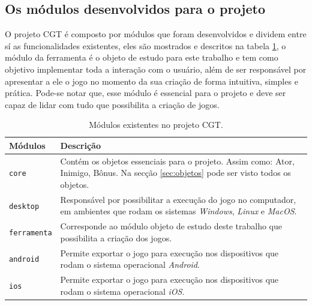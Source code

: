 \documentclass[12pt,twoside,openright,a4paper,english,brazil,sumario=tradicional]{abntex2}
\begin{document}
\subsection{Os módulos desenvolvidos para o projeto}
O projeto CGT é composto por módulos que foram desenvolvidos e dividem entre sí as funcionalidades existentes, eles são mostrados e descritos na tabela \ref{table:modulos}, o módulo da ferramenta é o objeto de estudo para este trabalho e tem como objetivo implementar toda a interação com o usuário, além de ser responsável por apresentar a ele o jogo no momento da sua criação de forma intuitiva, simples e prática. Pode-se notar que, esse módulo é essencial para o projeto e deve ser capaz de lidar com tudo que possibilita a criação de jogos.
\begin{table}[h]
   \centering
   \begin{tabular}{ | l | p{10cm} | }
      \hline
      \textbf{Módulos} & \textbf{Descrição} \\
      \hline
      \texttt{core} & Contém os objetos essenciais para o projeto. Assim como: Ator, Inimigo, Bônus. Na secção \ref{sec:objetos} pode ser visto todos os objetos. \\
      \hline
      \texttt{desktop} & Responsável por possibilitar a execução do jogo no computador, em ambientes que rodam os sistemas \emph{Windows}, \emph{Linux} e \emph{MacOS}. \\
      \hline
      \texttt{ferramenta} & Corresponde ao módulo objeto de estudo deste trabalho que possibilita a criação dos jogos. \\
      \hline
      \texttt{android} & Permite exportar o jogo para execução nos dispositivos que rodam o sistema operacional \emph{Android}. \\
      \hline
      \texttt{ios} & Permite exportar o jogo para execução nos dispositivos que rodam o sistema operacional \emph{iOS}. \\
      \hline
   \end{tabular}
   \caption{Módulos existentes no projeto CGT.}
   \label{table:modulos}
\end{table}
\end{document}

